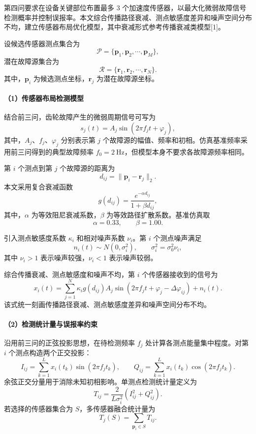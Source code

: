 \documentclass[UTF8,a4paper,12pt]{ctexart}
\numberwithin{figure}{section}
\numberwithin{table}{section}
\begin{document}
第四问要求在设备关键部位布置最多 3 个加速度传感器，以最大化微弱故障信号检测概率并控制误报率。本文综合传播路径衰减、测点敏感度差异和噪声空间分布不均，建立传感器布局优化模型，其中衰减形式参考传播衰减类模型[1]。

设候选传感器测点集合为
\[
\mathcal{P}=\{\boldsymbol p_1,\boldsymbol p_2,\cdots,\boldsymbol p_M\},
\]
潜在故障源集合为
\[
\mathcal{R}=\{\boldsymbol r_1,\boldsymbol r_2,\cdots,\boldsymbol r_N\}.
\]
其中，\(\boldsymbol p_i\) 为候选测点坐标，\(\boldsymbol r_j\) 为潜在故障源坐标。

\paragraph{（1）传感器布局检测模型}

结合前三问，齿轮故障产生的微弱周期信号可写为
\[
s_j(t)=A_j\sin(2\pi f_jt+\varphi_j),
\]
其中，\(A_j\)、\(f_j\)、\(\varphi_j\) 分别表示第 \(j\) 个故障源的幅值、频率和初相。仿真基准频率采用前三问得到的典型故障频率 \(f_0=2\ \mathrm{Hz}\)，但模型本身不要求各故障源频率相同。

第 \(i\) 个测点到第 \(j\) 个故障源的距离为
\[
d_{ij}=\|\boldsymbol p_i-\boldsymbol r_j\|_2.
\]
本文采用复合衰减函数
\[
g(d_{ij})=\frac{e^{-\alpha d_{ij}}}{1+\beta d_{ij}},
\]
其中，\(\alpha\) 为等效阻尼衰减系数，\(\beta\) 为等效路径扩散系数。基准仿真取
\[
\alpha=0.33,\qquad \beta=1.00.
\]

引入测点敏感度系数 \(\kappa_i\) 和相对噪声系数 \(\nu_i\)。第 \(i\) 个测点噪声满足
\[
n_i(t)\sim N(0,\sigma_i^2),\qquad \sigma_i^2=\sigma_0^2\nu_i,
\]
其中 \(\nu_i>1\) 表示噪声较强，\(\nu_i<1\) 表示噪声较弱。

综合传播衰减、测点敏感度和噪声不均，第 \(i\) 个传感器接收到的信号为
\[
x_i(t)=\sum_{j=1}^{N}\kappa_i g(d_{ij})A_j
\sin(2\pi f_jt+\varphi_j-\Delta\varphi_{ij})+n_i(t).
\]
该式统一刻画传播路径衰减、测点敏感度差异和噪声空间分布不均。

\paragraph{（2）检测统计量与误报率约束}

沿用前三问的正弦投影思想，在待检测频率 \(f_j\) 处计算各测点能量集中程度。对第 \(i\) 个测点构造两个正交投影：
\[
I_{ij}=\sum_{k=1}^{L}x_i(t_k)\sin(2\pi f_jt_k),
\qquad
Q_{ij}=\sum_{k=1}^{L}x_i(t_k)\cos(2\pi f_jt_k).
\]
余弦正交分量用于消除未知初相影响。单测点检测统计量定义为
\[
T_{ij}=\frac{2}{L\sigma_i^2}(I_{ij}^2+Q_{ij}^2).
\]
若选择的传感器集合为 \(S\)，多传感器融合统计量为
\[
T_j(S)=\sum_{\boldsymbol p_i\in S}T_{ij}.
\]
\end{document}
